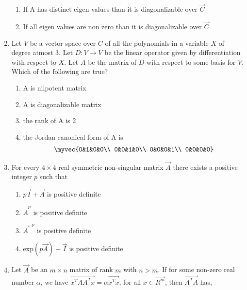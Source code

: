 \begin{enumerate}[label=\thesection.\arabic*.,ref=\thesection.\theenumi]
\begin{enumerate}
\item If A has distinct eigen values than  it is diagonalizable over $\vec{C}$

\item If all eigen values are non zero than it is diagonalizable over $\vec{C}$
\end{enumerate}
%
\solution

\twocolumn
\item Let $V$ be a vector space over $C$ of all the polynomials in a variable $X$ of degree atmost 3. Let $D:V \xrightarrow{} V$ be the linear operator given by differentiation with respect to $X$. Let $A$ be the matrix of $D$ with respect to some 
basis for $V$. Which of the following are true? \\
\begin{enumerate}
\item A is nilpotent matrix \\
\item A is diagonalizable matrix \\ 
\item the rank of A is 2 \\
\item the Jordan canonical form of A is
\begin{align}\nonumber
    \myvec{0&1&0&0\\
       0&0&1&0\\
       0&0&0&1\\
       0&0&0&0}
\end{align}
\end{enumerate}
%
\solution

\item For every $4 \times 4$ real symmetric non-singular matrix $\vec{A}$ there 
exists a positive integer $p$ such that

    \begin{enumerate}
        \item $p\vec{I}+\vec{A}$ is positive definite
        \item $\vec{A}^p$ is positive definite
        \item $\vec{A}^{-p}$ is positive definite
        \item $\text{exp}(p\vec{A})-\vec{I}$ is positive definite
        \end{enumerate}
\solution

\item Let $\vec{A}$ be an $m \times n$ matrix of rank $m$ with $n>m$. If for some non-zero real number $\alpha$, we have $\vec{x^TAA^Tx} = \alpha\vec{x^Tx}$, for all $x \in \vec{R^m}$, then $\vec{A^TA}$ has,
\begin{enumerate}


\end{enumerate}
\end{enumerate}

